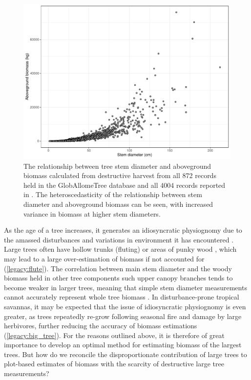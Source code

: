 \begin{refsection}
\begin{figure}[!h]
\centering
	\includegraphics[width=\textwidth]{img/allometry}
	\caption[Scatter plot of stem diameter and biomass from GlobAllomeTree database]{The relationship between tree stem diameter and aboveground biomass calculated from destructive harvest from all 872 records held in the GlobAllomeTree database \citep{Henry2013} and all 4004 records reported in \citet{Chave2014}. The heteroscedasticity of the relationship between stem diameter and aboveground biomass can be seen, with increased variance in biomass at higher stem diameters.}
	\label{legacy:allometry}
\end{figure}

As the age of a tree increases, it generates an idiosyncratic physiognomy due to the amassed disturbances and variations in environment it has encountered \citep{Lindenmayer2016}. Large trees often have hollow trunks (fluting) or areas of punky wood \citep{Chambers2001, Ruxton2014}, which may lead to a large over-estimation of biomass if not accounted for (\autoref{legacy:flute}). The correlation between main stem diameter and the woody biomass held in other tree components such upper canopy branches tends to become weaker in larger trees, meaning that simple stem diameter measurements cannot accurately represent whole tree biomass \citep{Goodman2014, Saglam2020}. In disturbance-prone tropical savannas, it may be expected that the issue of idiosyncratic physiognomy is even greater, as trees repeatedly re-grow following seasonal fire and damage by large herbivores, further reducing the accuracy of biomass estimations (\autoref{legacy:big_tree}). For the reasons outlined above, it is therefore of great importance to develop an optimal method for estimating biomass of the largest trees. But how do we reconcile the disproportionate contribution of large trees to plot-based estimates of biomass with the scarcity of destructive large tree measurements?


\end{refsection}
